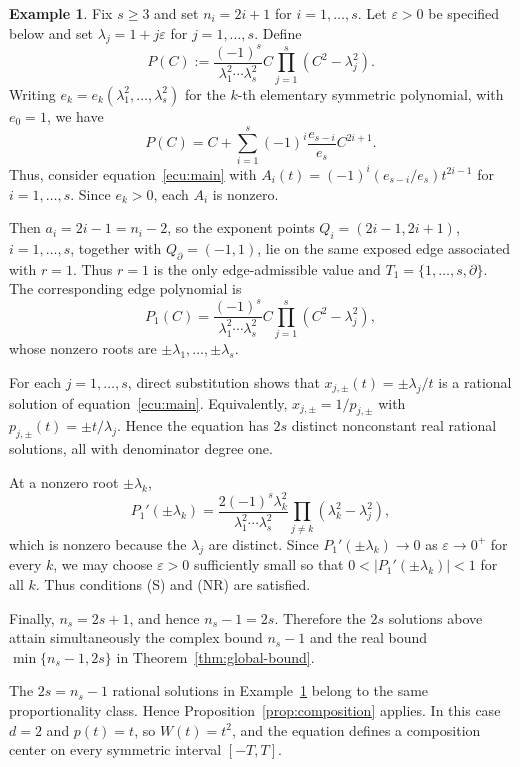 \documentclass[12pt,a4paper]{amsart}
\numberwithin{theorem}{section}
\theoremstyle{definition}
\newtheorem{example}[theorem]{Example}
\begin{document}
	\begin{example}\label{ex}
		Fix $s\geq3$ and set $n_i=2i+1$ for $i=1,\ldots,s$. Let $\varepsilon>0$ be specified below and set $\lambda_j=1+j\varepsilon$ for $j=1,\ldots,s$. Define
		\[
		P(C):=\frac{(-1)^s}{\lambda_1^2\cdots\lambda_s^2}C\prod_{j=1}^s(C^2-\lambda_j^2).
		\]
		Writing $e_k=e_k(\lambda_1^2,\ldots,\lambda_s^2)$ for the
		$k$-th elementary symmetric polynomial, with $e_0=1$, we have
		\[
		P(C)=C+\sum_{i=1}^s(-1)^i\frac{e_{s-i}}{e_s}C^{2i+1}.
		\]
		Thus, consider equation~\eqref{ecu:main} with $A_i(t)=(-1)^i(e_{s-i}/e_s)t^{2i-1}$ for $i=1,\ldots,s$. Since $e_k>0$, each $A_i$ is nonzero.
		
		Then $a_i=2i-1=n_i-2$, so the exponent points $Q_i=(2i-1,2i+1)$, $i=1,\ldots,s$, together with $Q_\partial=(-1,1)$, lie on the same exposed edge associated with $r=1$. Thus $r=1$ is the only edge-admissible value and $T_1=\{1,\ldots,s,\partial\}$. The corresponding edge polynomial is
		\[
		P_1(C)=\frac{(-1)^s}{\lambda_1^2\cdots\lambda_s^2}C\prod_{j=1}^s(C^2-\lambda_j^2),
		\]
		whose nonzero roots are $\pm\lambda_1,\ldots,\pm\lambda_s$.
		
		For each $j=1,\ldots,s$, direct substitution shows that $x_{j,\pm}(t)=\pm\lambda_j/t$ is a rational solution of equation~\eqref{ecu:main}. Equivalently, $x_{j,\pm}=1/p_{j,\pm}$ with $p_{j,\pm}(t)=\pm t/\lambda_j$. Hence the equation has $2s$ distinct nonconstant real rational solutions, all with denominator degree one.
		
		At a nonzero root $\pm\lambda_k$,
		\[
		P_1'(\pm\lambda_k)=\frac{2(-1)^s\lambda_k^2}{\lambda_1^2\cdots\lambda_s^2}\prod_{j\neq k}(\lambda_k^2-\lambda_j^2),
		\]
		which is nonzero because the $\lambda_j$ are distinct. Since $P_1'(\pm\lambda_k)\to0$ as $\varepsilon\to0^+$ for every $k$, we may choose $\varepsilon>0$ sufficiently small so that $0<|P_1'(\pm\lambda_k)|<1$ for all $k$. Thus conditions {\rm (S)} and {\rm (NR)} are satisfied.
		
		Finally, $n_s=2s+1$, and hence $n_s-1=2s$. Therefore the $2s$ solutions above attain simultaneously the complex bound $n_s-1$ and the real bound $\min\{n_s-1,2s\}$ in Theorem~\ref{thm:global-bound}.
	\end{example}
	
	The $2s=n_s-1$ rational solutions in Example~\ref{ex} belong to the same proportionality class. Hence Proposition~\ref{prop:composition} applies. In this case $d=2$ and $p(t)=t$, so $W(t)=t^2$, and the equation defines a composition center on every symmetric interval $[-T,T]$.
	
\end{document}
